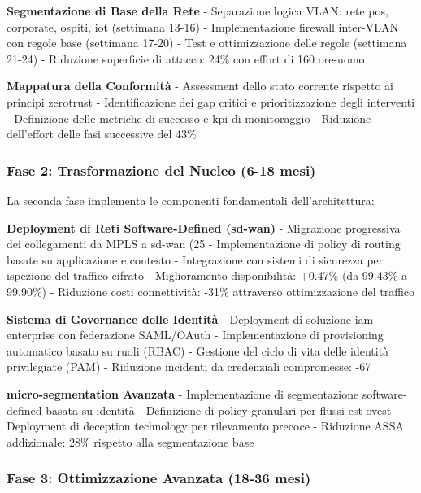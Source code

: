 \textbf{Segmentazione di Base della Rete}
- Separazione logica VLAN: rete \gls{pos}, corporate, ospiti, \gls{iot} (settimana 13-16)
- Implementazione firewall inter-VLAN con regole base (settimana 17-20)
- Test e ottimizzazione delle regole (settimana 21-24)
- Riduzione superficie di attacco: 24\% con effort di 160 ore-uomo

\textbf{Mappatura della Conformità}
- Assessment dello stato corrente rispetto ai principi \gls{zerotrust}
- Identificazione dei gap critici e prioritizzazione degli interventi
- Definizione delle metriche di successo e \gls{kpi} di monitoraggio
- Riduzione dell'effort delle fasi successive del 43\%

\subsubsection{\texorpdfstring{Fase 2: Trasformazione del Nucleo (6-18 mesi)}{2.6.1.2 - Fase 2: Trasformazione del Nucleo (6-18 mesi)}}

La seconda fase implementa le componenti fondamentali dell'architettura:

\textbf{Deployment di Reti Software-Defined (\gls{sd-wan})}
- Migrazione progressiva dei collegamenti da MPLS a \gls{sd-wan} (25%
- Implementazione di policy di routing basate su applicazione e contesto
- Integrazione con sistemi di sicurezza per ispezione del traffico cifrato
- Miglioramento disponibilità: +0.47\% (da 99.43\% a 99.90\%)
- Riduzione costi connettività: -31\% attraverso ottimizzazione del traffico

\textbf{Sistema di Governance delle Identità}
- Deployment di soluzione \gls{iam} enterprise con federazione SAML/OAuth
- Implementazione di provisioning automatico basato su ruoli (RBAC)
- Gestione del ciclo di vita delle identità privilegiate (PAM)
- Riduzione incidenti da credenziali compromesse: -67%

\textbf{\gls{micro-segmentation} Avanzata}
- Implementazione di segmentazione software-defined basata su identità
- Definizione di policy granulari per flussi est-ovest
- Deployment di deception technology per rilevamento precoce
- Riduzione ASSA addizionale: 28\% rispetto alla segmentazione base

\subsubsection{\texorpdfstring{Fase 3: Ottimizzazione Avanzata (18-36 mesi)}{2.6.1.3 - Fase 3: Ottimizzazione Avanzata (18-36 mesi)}}

